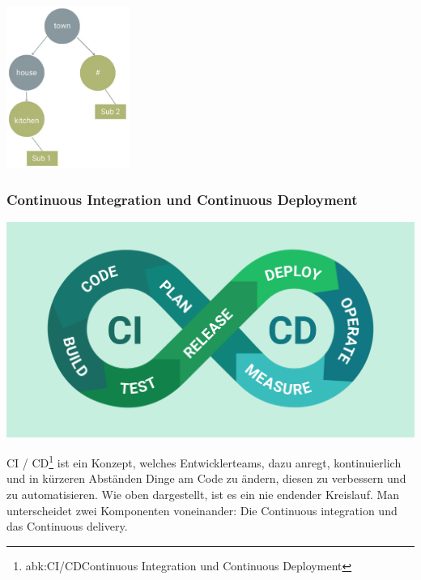 \documentclass[
    headings=optiontotocandhead,%
    twoside,
    numbers=noenddot,%
    12pt, %
    titlepage, %
    parskip=full, %
    listof=leveldown, 
    numbers=noenddot, %
    a4paper,DIV=14,
    BCOR=15mm,
]{scrbook}
\let\origfigure=\figure
\let\endorigfigure=\endfigure
\renewenvironment{figure}[1][]{%
   \origfigure[H]
}{%
   \endorigfigure
}
\begin{document}
\begin{figure}
\centering
\includegraphics[width=0.3\textwidth,height=\textheight]{img/Schrempf/MQTT-Topic-Structure.png}
\caption{Beispiel MQTT Topic Structure
{[}\protect\hyperlink{ref-mqtt-hivemq}{20}{]}}
\end{figure}

\hypertarget{continuous-integration-und-continuous-deployment}{%
\subsubsection{Continuous Integration und Continuous
Deployment}\label{continuous-integration-und-continuous-deployment}}

\begin{figure}
\centering
\includegraphics[width=1\textwidth,height=\textheight]{img/Schrempf/CI-CD.png}
\caption{CI / CD Ablauf {[}\protect\hyperlink{ref-bestarion}{21}{]}}
\end{figure}

CI / CD\footnote{abk:CI/CD\textbar Continuous Integration und Continuous
  Deployment} ist ein Konzept, welches Entwicklerteams, dazu anregt,
kontinuierlich und in kürzeren Abständen Dinge am Code zu ändern, diesen
zu verbessern und zu automatisieren. Wie oben dargestellt, ist es ein
nie endender Kreislauf. Man unterscheidet zwei Komponenten voneinander:
Die Continuous integration und das Continuous delivery.
\end{document}
